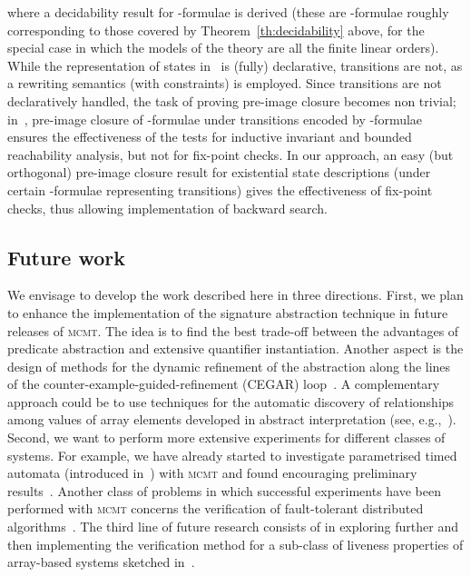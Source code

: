 \documentclass{LMCS}
\theoremstyle{plain}\newtheorem{assumption}[thm]{Assumption}
\theoremstyle{plain}\newtheorem{proposition}[thm]{Proposition}
\theoremstyle{plain}\newtheorem{property}[thm]{Property}
\theoremstyle{plain}\newtheorem{example}[thm]{Example}
\theoremstyle{plain}\newtheorem{claim}[thm]{Claim}
\theoremstyle{plain}\newtheorem{lemma}[thm]{Lemma}
\begin{document}
where a decidability result for -formulae is derived
(these are -formulae roughly corresponding to those
covered by Theorem~\ref{th:decidability} above, for the special case
in which the models of the theory  are all the finite linear
orders).  While the representation of states in~\cite{bouajjani-rew}
is (fully) declarative, transitions are not, as a rewriting semantics
(with constraints) is employed.  Since transitions are not
declaratively handled, the task of proving pre-image closure becomes
non trivial;
in~\cite{bouajjani-rew}, pre-image closure of -formulae
under transitions encoded by -formulae ensures the
effectiveness of the tests for inductive invariant and bounded
reachability analysis, but not for fix-point checks.  In our approach,
an easy (but orthogonal) pre-image closure result for existential
state descriptions (under certain -formulae representing
transitions) gives the effectiveness of fix-point checks, thus
allowing implementation of backward search.

\subsection{Future work}

We envisage to develop the work described here in three directions.
First, we plan to enhance the implementation of the signature
abstraction technique in future releases of \textsc{mcmt}.  The idea
is to find the best trade-off between the advantages of predicate
abstraction and extensive quantifier instantiation.  Another aspect is
the design of methods for the dynamic refinement of the abstraction
along the lines of the counter-example-guided-refinement (CEGAR)
loop~\cite{seminal}.
A complementary approach could be to use techniques for the automatic
discovery of relationships among values of array elements developed in
abstract interpretation (see, e.g.,~\cite{popl05}).  Second, we want
to perform more extensive experiments for different classes of
systems.  For example, we have already started to investigate
parametrised timed automata (introduced in~\cite{AbdullaTCS}) with
\textsc{mcmt} and found encouraging preliminary results~\cite{verify}.
Another class of problems in which successful experiments have been
performed with \textsc{mcmt} concerns the verification of
fault-tolerant distributed
algorithms~\cite{Francesco1,Francesco2}.
The third line of future research consists of in exploring further and
then implementing the verification method for a sub-class of liveness
properties of array-based systems sketched in~\cite{ijcar08}.
\end{document}
